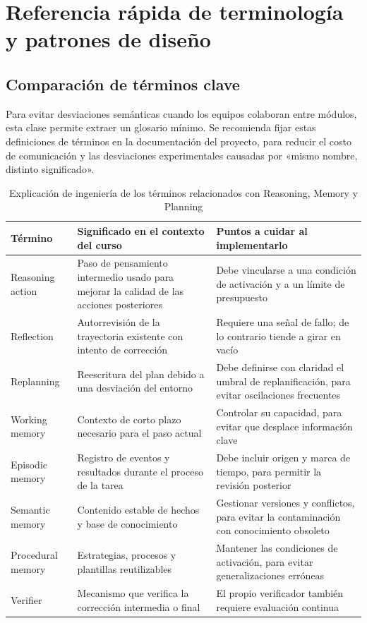 \section{Referencia rápida de terminología y patrones de diseño}

\subsection{Comparación de términos clave}
Para evitar desviaciones semánticas cuando los equipos colaboran entre módulos, esta clase permite extraer un glosario mínimo. Se recomienda fijar estas definiciones de términos en la documentación del proyecto, para reducir el costo de comunicación y las desviaciones experimentales causadas por «mismo nombre, distinto significado».

\begin{table}[H]
\centering
\begin{tabular}{p{2.8cm}p{3.6cm}p{4.1cm}}
\toprule
\textbf{Término} & \textbf{Significado en el contexto del curso} & \textbf{Puntos a cuidar al implementarlo} \\
\midrule
Reasoning action & Paso de pensamiento intermedio usado para mejorar la calidad de las acciones posteriores & Debe vincularse a una condición de activación y a un límite de presupuesto \\
Reflection & Autorrevisión de la trayectoria existente con intento de corrección & Requiere una señal de fallo; de lo contrario tiende a girar en vacío \\
Replanning & Reescritura del plan debido a una desviación del entorno & Debe definirse con claridad el umbral de replanificación, para evitar oscilaciones frecuentes \\
Working memory & Contexto de corto plazo necesario para el paso actual & Controlar su capacidad, para evitar que desplace información clave \\
Episodic memory & Registro de eventos y resultados durante el proceso de la tarea & Debe incluir origen y marca de tiempo, para permitir la revisión posterior \\
Semantic memory & Contenido estable de hechos y base de conocimiento & Gestionar versiones y conflictos, para evitar la contaminación con conocimiento obsoleto \\
Procedural memory & Estrategias, procesos y plantillas reutilizables & Mantener las condiciones de activación, para evitar generalizaciones erróneas \\
Verifier & Mecanismo que verifica la corrección intermedia o final & El propio verificador también requiere evaluación continua \\
\bottomrule
\end{tabular}
\caption{Explicación de ingeniería de los términos relacionados con Reasoning, Memory y Planning}
\end{table}

